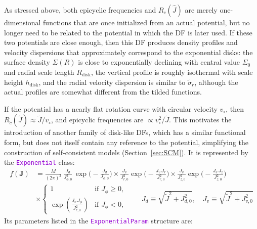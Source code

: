 \documentclass[12pt]{article}
\newcommand{\ttt}[1]{\textcolor{darkviolet}{\texttt{#1}}}
\newcommand{\bJ}{\boldsymbol{J}}
\begin{document}
As stressed above, both epicyclic frequencies and $R_c(\hat J)$ are merely one-dimensional functions that are once initialized from an actual potential, but no longer need to be related to the potential in which the DF is later used. If these two potentials are close enough, then this DF produces density profiles and velocity dispersions that approximately correspond to the exponential disks: the surface density $\Sigma(R)$ is close to exponentially declining with central value $\Sigma_0$ and radial scale length $R_\mathrm{disk}$, the vertical profile is roughly isothermal with scale height $h_\mathrm{disk}$, and the radial velocity dispersion is similar to $\tilde\sigma_r$, although the actual profiles are somewhat different from the tilded functions.

If the potential has a nearly flat rotation curve with circular velocity $v_\circ$, then $R_c(\tilde J) \approx \tilde J/v_\circ$, and epicyclic frequencies are $\propto v_\circ^2 / \tilde J$. This motivates the introduction of another family of disk-like DFs, which has a similar functional form, but does not itself contain any reference to the potential, simplifying the construction of self-consistent models (Section~\ref{sec:SCM}). It is represented by the \ttt{Exponential} class:
\begin{align*}
f(\bJ) &= \frac{M}{(2\pi)^3}\, \frac{J_d}{J_{\phi,0}^2}\, \exp\bigg(-\frac{J_d}{J_{\phi,0}}\bigg) \times
\frac{J_v}{J_{r,0}^2} \exp\bigg(-\frac{J_v\,J_r}{J_{r,0}^2}\bigg) \times
\frac{J_v}{J_{z,0}^2} \exp\bigg(-\frac{J_v\,J_z}{J_{z,0}^2}\bigg) \\
&\times \left\{ \begin{array}{ll}  1 & \mbox{if }J_\phi\ge 0, \\
\exp\left(\frac{J_v\,J_\phi}{J_{r,0}^2} \right) & \mbox{if }J_\phi<0, \end{array} \right. \qquad
J_d \equiv \sqrt{\tilde J^2 + J_{d,0}^2}, \quad
J_v \equiv \sqrt{\tilde J^2 + J_{v,0}^2}
\end{align*}
Its parameters listed in the \ttt{ExponentialParam} structure are:
\end{document}

